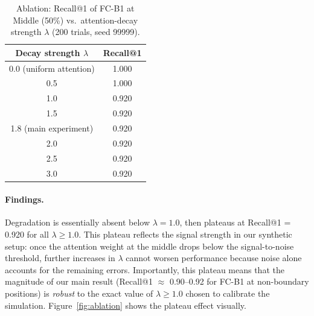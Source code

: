 \documentclass[sigconf,nonacm]{acmart}
\begin{document}
\begin{table}[t]
  \centering
  \caption{Ablation: Recall@1 of FC-B1 at Middle (50\%) vs.\ attention-decay
           strength $\lambda$ (200 trials, seed 99999).}
  \label{tab:ablation}
  \begin{tabular}{cc}
    \toprule
    Decay strength $\lambda$ & Recall@1 \\
    \midrule
    0.0 (uniform attention) & 1.000 \\
    0.5                     & 1.000 \\
    1.0                     & 0.920 \\
    1.5                     & 0.920 \\
    1.8 (main experiment)   & 0.920 \\
    2.0                     & 0.920 \\
    2.5                     & 0.920 \\
    3.0                     & 0.920 \\
    \bottomrule
  \end{tabular}
\end{table}

\paragraph{Findings.}
Degradation is essentially absent below $\lambda = 1.0$, then plateaus at
Recall@1 = 0.920 for all $\lambda \geq 1.0$.
This plateau reflects the signal strength in our synthetic setup: once the
attention weight at the middle drops below the signal-to-noise threshold, further
increases in $\lambda$ cannot worsen performance because noise alone accounts for
the remaining errors.
Importantly, this plateau means that the magnitude of our main result
(Recall@1 $\approx$ 0.90--0.92 for FC-B1 at non-boundary positions) is
\emph{robust} to the exact value of $\lambda \geq 1.0$ chosen to calibrate the
simulation.
Figure~\ref{fig:ablation} shows the plateau effect visually.
\end{document}
